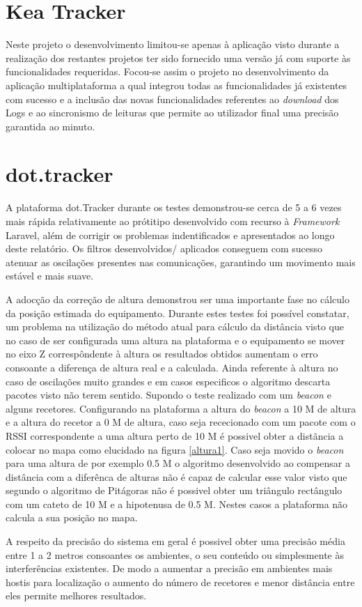 \section{Kea Tracker}

\par Neste projeto o desenvolvimento limitou-se apenas à aplicação visto durante a realização dos restantes projetos ter sido fornecido uma versão já com suporte às funcionalidades requeridas. Focou-se assim o projeto no desenvolvimento da aplicação multiplataforma a qual integrou todas as funcionalidades já existentes com sucesso e a inclusão das novas funcionalidades  referentes ao \textit{download} dos Logs e ao sincronismo de leituras que permite ao utilizador final uma precisão garantida ao minuto.

\section{dot.tracker}

\par A plataforma dot.Tracker durante os testes demonstrou-se cerca de 5 a 6 vezes mais rápida relativamente ao prótitipo desenvolvido com recurso à \textit{Framework} Laravel, além de corrigir os problemas indentificados e apresentados ao longo deste relatório. Os filtros desenvolvidos/ aplicados conseguem com sucesso atenuar as oscilações presentes nas comunicações, garantindo um movimento mais estável e mais suave. 
\par  A adocção da correção de altura demonstrou ser uma importante fase no cálculo da posição estimada do equipamento. Durante estes testes foi possível constatar, um problema na utilização do método atual para cálculo da distância visto que no caso de ser configurada uma altura na plataforma e o equipamento se mover no eixo Z correspôndente à altura os resultados obtidos aumentam o erro consoante a diferença de altura real e a calculada.  Ainda referente à altura no caso de oscilações muito grandes  e em casos especificos o algoritmo descarta pacotes visto não terem sentido. Supondo o teste realizado com um \textit{beacon} e alguns recetores. Configurando na plataforma a altura do \textit{beacon} a 10 M de altura e a altura do recetor a 0 M de altura, caso seja rececionado com um pacote com o RSSI correspondente a uma altura  perto de 10 M é possivel obter a distãncia a colocar no mapa como elucidado na figura \ref{altura1}. Caso seja movido o \textit{beacon} para uma altura de por exemplo 0.5 M o algoritmo desenvolvido ao compensar a distância com a diferênca de alturas não é capaz de calcular esse valor visto que segundo o algoritmo de Pitágoras não é possivel obter um triângulo rectângulo com um cateto de 10 M e a hipotenusa de 0.5 M. Nestes casos a plataforma não calcula  a sua posição no mapa.
\par A respeito da precisão do sistema em geral é possivel obter uma precisão média entre 1 a 2 metros  consoantes os ambientes, o seu conteúdo ou simplesmente às interferências existentes. De modo a aumentar a  precisão em ambientes mais hostis para localização o aumento do número de recetores e menor distância entre eles permite melhores resultados.